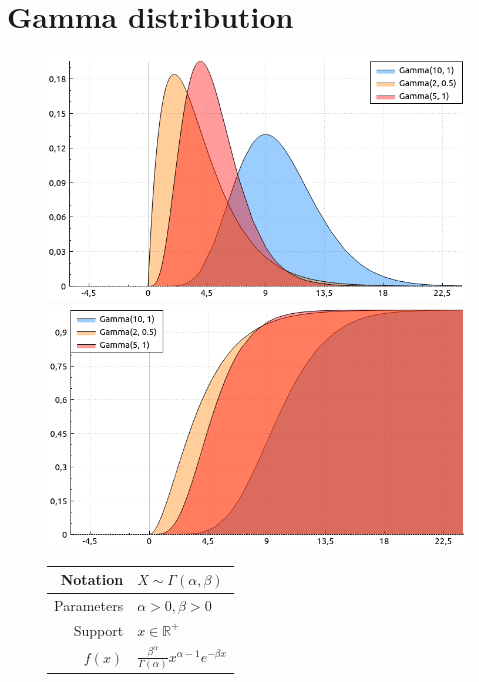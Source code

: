 \documentclass[a4paper,11pt]{article}
\theoremstyle{plain}
\theoremstyle{definition}
\newcommand{\MR}{\mathbb{R}}
\begin{document}
	\section{Gamma distribution}
	\begin{figure}[!htb]\centering
		\begin{minipage}{0.55\textwidth}
			\includegraphics[width=\linewidth, right]{gamma_pdf}
			\captionsetup{labelformat=empty}
			\includegraphics[width=\linewidth, right]{gamma_cdf}
			\captionsetup{labelformat=empty}
		\end{minipage}
		\begin{minipage}{0.4\textwidth}
			\begin{tabular}{| r | l |}
				\hline
				Notation & $X \sim \Gamma(\alpha, \beta)$ \\
				\hline
				Parameters & $\alpha > 0, \beta > 0$ \\
				\hline
				Support & $x \in \MR^+$  \\
				\hline
				$f(x)$ & $\frac{\beta^\alpha}{\Gamma(\alpha)} x^{\alpha-1}e^{-\beta x}  $ \\
				\hline

\end{tabular}
\end{minipage}
\end{figure}
\end{document}
